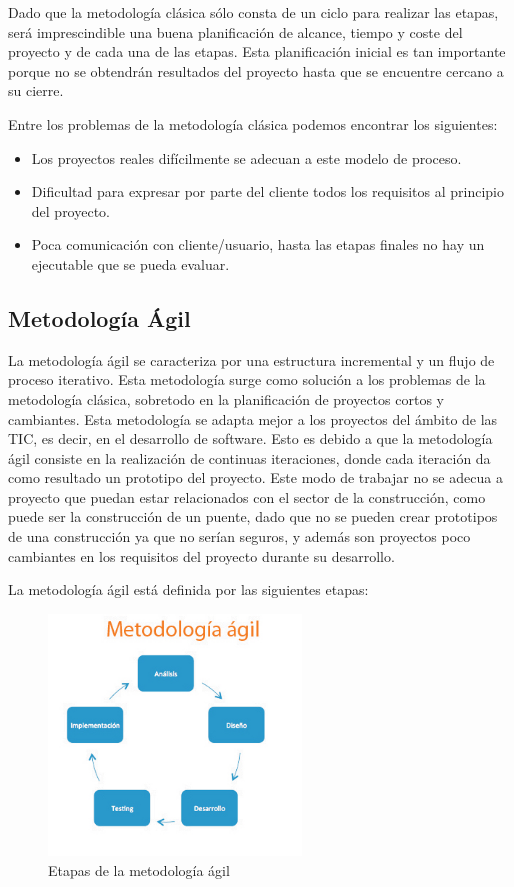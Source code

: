 \newpage

Dado que la metodología clásica sólo consta de un ciclo para realizar las etapas, será imprescindible una buena planificación de alcance, tiempo y coste del proyecto y de cada una de las etapas. Esta planificación inicial es tan importante porque no se obtendrán resultados del proyecto hasta que se encuentre cercano a su cierre.

Entre los problemas de la metodología clásica podemos encontrar los siguientes:

\begin{itemize}
    \item Los proyectos reales difícilmente se adecuan a este modelo de proceso.
    \item Dificultad para expresar por parte del cliente todos los requisitos al principio del proyecto.
    \item Poca comunicación con cliente/usuario, hasta las etapas finales no hay un ejecutable que se pueda evaluar.
\end{itemize}

\subsection*{Metodología Ágil}

La metodología ágil se caracteriza por una estructura incremental y un flujo de proceso iterativo. Esta metodología surge como solución a los problemas de la metodología clásica, sobretodo en la planificación de proyectos cortos y cambiantes. Esta metodología se adapta mejor a los proyectos del ámbito de las TIC, es decir, en el desarrollo de software. Esto es debido a que la metodología ágil consiste en la realización de continuas iteraciones, donde cada iteración da como resultado un prototipo del proyecto. Este modo de trabajar no se adecua a proyecto que puedan estar relacionados con el sector de la construcción, como puede ser la construcción de un puente, dado que no se pueden crear prototipos de una construcción ya que no serían seguros, y además son proyectos poco cambiantes en los requisitos del proyecto durante su desarrollo.

La metodología ágil está definida por las siguientes etapas:

\begin{figure}[h]
    \centering
    \includegraphics[width=0.6\textwidth]{imagenes/metodologia/meto_agil.jpg}
    \caption{Etapas de la metodología ágil}
\end{figure}

